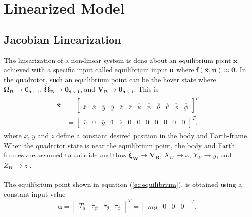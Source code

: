 \section{Linearized Model}
\label{sec:linearized}
\setcounter{MaxMatrixCols}{20}
\subsection{Jacobian Linearization}
The linearization of a non-linear system is done about an equilibrium point $\overline{\mathbf{x}}$ achieved with a specific input called equilibrium input $\overline{\mathbf{u}}$  where $\mathbf{f(\overline{x},\overline{u})} \approx \mathbf{0}$. In the quadrotor, such an equilibrium point can be the hover state where $\mathbf{\Omega_B} \to \mathbf{0_{3\times 1}}$, $\mathbf{\dot{\Omega}_B} \to \mathbf{0_{3\times 1}}$, and $\mathbf{V_{B}} \to \mathbf{0_{3\times 1}}$. This is
\begin{align}
\label{ec:equilibrium}
\begin{split}
\overline{\mathbf{x}} & = \begin{bmatrix}
\overline{x} & \dot{\overline{x}} & \overline{y} & \dot{\overline{y}} & \overline{z} & \dot{\overline{z}} & \overline{\psi} & \dot{\overline{\psi}} & \overline{\theta} & \dot{\overline{\theta}} & \overline{\phi} & \dot{\overline{\phi}}
\end{bmatrix}^{T}\\
 & = \begin{bmatrix}
\overline{x} & 0 & \overline{y} & 0 & \overline{z} & 0 & 0 & 0 & 0 & 0 & 0 & 0
\end{bmatrix}^{T},
\end{split}
\end{align}
where $\overline{x}$, $\overline{y}$ and $\overline{z}$ define a constant desired position in the body and Earth-frame. When the quadrotor state is near the equilibrium point, the body and Earth frames are assumed to coincide and thus $\mathbf{\dot{\xi}_W}\to \mathbf{V_{B}}$, $X_W \to x$, $Y_W \to y$, and $Z_W \to z$ \cite{Sabatino2015}.\\\\
The equilibrium point shown in equation (\ref{ec:equilibrium}), is obtained using a constant input value
\begin{equation}
\overline{\mathbf{u}} = \begin{bmatrix}
T_u & \tau_\psi & \tau_\theta & \tau_\phi
\end{bmatrix}^{T} = \begin{bmatrix}
mg & 0 & 0 & 0
\end{bmatrix}^{T},
\end{equation}
